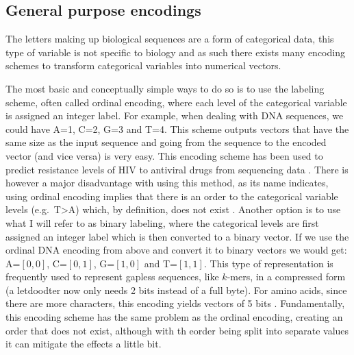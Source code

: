\documentclass[
  11pt,
  twoside,
  BCOR=10mm,
  listof=totoc]{scrbook}
\begin{document}
\hypertarget{general-purpose-encodings}{%
\subsection{General purpose encodings}\label{general-purpose-encodings}}

The letters making up biological sequences are a form of categorical data, this type of variable is not specific to biology and as such there exists many encoding schemes \autocite{potdarComparativeStudyCategorical2017} to transform categorical variables into numerical vectors.

The most basic and conceptually simple ways to do so is to use the labeling scheme, often called ordinal encoding, where each level of the categorical variable is assigned an integer label. For example, when dealing with DNA sequences, we could have A=1, C=2, G=3 and T=4. This scheme outputs vectors that have the same size as the input sequence and going from the sequence to the encoded vector (and vice versa) is very easy. This encoding scheme has been used to predict resistance levels of HIV to antiviral drugs from sequencing data \autocite{steinerDrugResistancePrediction2020a}. There is however a major disadvantage with using this method, as its name indicates, using ordinal encoding implies that there is an order to the categorical variable levels (e.g.~T\textgreater A) which, by definition, does not exist \autocite{hassanisaadiInterpretiveTimefrequencyAnalysis2017,brouwerFeedforwardNetworkInput2002,kunanbayevComplexEncoding2021}. Another option is to use what I will refer to as binary labeling, where the categorical levels are first assigned an integer label which is then converted to a binary vector. If we use the ordinal DNA encoding from above and convert it to binary vectors we would get: A=\([0,0]\), C=\([0,1]\), G=\([1,0]\) and T=\([1,1]\). This type of representation is frequently used to represent gapless sequences, like \(k\)-mers, in a compressed form \autocite{dufresneKmerFileFormat2022,wrightUsingDECIPHERV22016} (a letdoodter now only needs 2 bits instead of a full byte). For amino acids, since there are more characters, this encoding yields vectors of 5 bits \autocite{zamaniAminoAcidEncoding2011}. Fundamentally, this encoding scheme has the same problem as the ordinal encoding, creating an order that does not exist, although with th eorder being split into separate values it can mitigate the effects a little bit.
\end{document}
